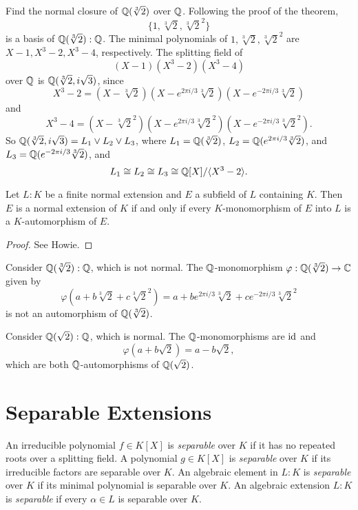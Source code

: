 \begin{example}
  Find the normal closure of $\mathbb{Q}(\sqrt[3]{2})$ over $\mathbb{Q}$.
  Following the proof of the theorem,
  \[
    \{1, \sqrt[3]{2}, \sqrt[3]{2}^2\}
  \]
  is a basis of $\mathbb{Q}(\sqrt[3]{2}) : \mathbb{Q}$. The minimal
  polynomials of $1, \sqrt[3]{2}, \sqrt[3]{2}^2$ are
  $X - 1, X^3 - 2, X^3 - 4$, respectively. The
  splitting field of
  \[
    (X - 1)(X^3 - 2)(X^3 - 4)
  \]
  over $\mathbb{Q}$ is $\mathbb{Q}(\sqrt[3]{2}, i\sqrt{3})$, since
  \[
    X^3 - 2 = (X - \sqrt[3]{2})(X - e^{2\pi i / 3} \sqrt[3]{2})(X - e^{-2\pi i / 3} \sqrt[3]{2})
  \]
  and
  \[
    X^3 - 4 = (X - \sqrt[3]{2}^2)(X - e^{2\pi i / 3} \sqrt[3]{2}^2)(X - e^{-2\pi i / 3} \sqrt[3]{2}^2).
  \]
  So $\mathbb{Q}(\sqrt[3]{2}, i\sqrt{3}) = L_1 \lor L_2 \lor L_3$,
  where $L_1 = \mathbb{Q}(\sqrt[3]{2})$, $L_2 = \mathbb{Q}(e^{2\pi i / 3} \sqrt[3]{2})$,
  and $L_3 = \mathbb{Q}(e^{-2\pi i / 3} \sqrt[3]{2})$, and
  \[
    L_1 \cong L_2 \cong L_3 \cong \mathbb{Q}[X] / \langle X^3 - 2 \rangle.
  \]
\end{example}

\begin{theorem}
  Let $L : K$ be a finite normal extension and $E$ a
  subfield
  of $L$ containing $K$. Then $E$ is a normal extension
  of $K$ if and only if every $K$-monomorphism of
  $E$ into $L$ is a $K$-automorphism of $E$.
\end{theorem}

\begin{proof}
  See Howie.
\end{proof}

\begin{example}
  Consider $\mathbb{Q}(\sqrt[3]{2}) : \mathbb{Q}$, which is not normal.
  The $\mathbb{Q}$-monomorphism $\varphi : \mathbb{Q}(\sqrt[3]{2}) \to \mathbb{C}$
  given by
  \[
    \varphi(a + b\sqrt[3]{2} + c\sqrt[3]{2}^2) = a + be^{2\pi i / 3} \sqrt[3]{2} + ce^{-2\pi i / 3} \sqrt[3]{2}^2
  \]
  is not an automorphism of $\mathbb{Q}(\sqrt[3]{2})$.
\end{example}

\begin{example}
  Consider $\mathbb{Q}(\sqrt{2}) : \mathbb{Q}$, which is normal. The
  $\mathbb{Q}$-monomorphisms are $\mathrm{id}$ and
  \[\varphi(a + b\sqrt{2}) = a - b\sqrt{2},\]
  which are both $\mathbb{Q}$-automorphisms of $\mathbb{Q}(\sqrt{2})$.
\end{example}

\section{Separable Extensions}

\begin{definition}
  An irreducible polynomial $f \in K[X]$ is
  \emph{separable} over $K$ if it has no repeated roots
  over a splitting field. A polynomial $g \in K[X]$ is
  \emph{separable} over $K$ if its irreducible factors
  are separable over $K$. An algebraic element in $L : K$
  is \emph{separable} over $K$ if its minimal polynomial
  is separable over $K$. An algebraic extension $L : K$
  is \emph{separable} if every $\alpha \in L$ is separable
  over $K$.
\end{definition}

